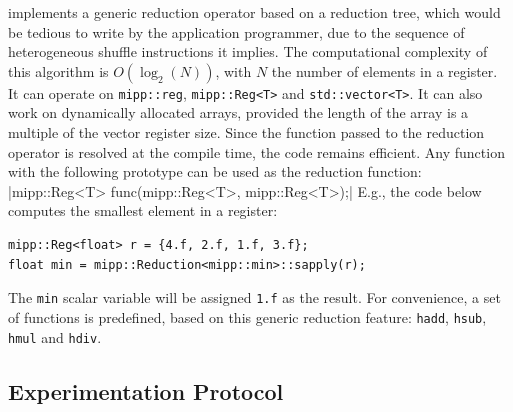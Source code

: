 \MIPP implements a generic reduction operator based on a reduction tree, which
would be tedious to write by the application programmer, due to the sequence of
heterogeneous shuffle instructions it implies. The computational complexity of
this algorithm is $O(\log_2(N))$, with $N$ the number of elements in a register.
It can operate on \verb|mipp::reg|, \verb|mipp::Reg<T>| and
\verb|std::vector<T>|. It can also work on dynamically allocated arrays,
provided the length of the array is a multiple of the vector register size.
Since the function passed to the reduction operator is resolved at the compile
time, the code remains efficient. Any function with the following prototype can
be used as the reduction function:
|mipp::Reg<T> func(mipp::Reg<T>, mipp::Reg<T>);|
E.g., the code below computes the smallest element in a register:
\begin{verbatim}
mipp::Reg<float> r = {4.f, 2.f, 1.f, 3.f};
float min = mipp::Reduction<mipp::min>::sapply(r);
\end{verbatim}
The \verb|min| scalar variable will be assigned \verb|1.f| as the result. For
convenience, a set of functions is predefined, based on this generic reduction
feature: \verb|hadd|, \verb|hsub|, \verb|hmul| and \verb|hdiv|.

\subsection{Experimentation Protocol}

